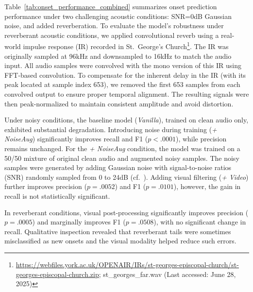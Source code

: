 \documentclass{article}
\begin{document}
Table~\ref{tab:onset_performance_combined} summarizes onset prediction performance under two challenging acoustic conditions: SNR=0\si{dB} Gaussian noise, and added reverberation. To evaluate the model's robustness under reverberant acoustic conditions, we applied convolutional reverb using a real-world impulse response (IR) recorded in St.~George's Church\footnote{\href{https://webfiles.york.ac.uk/OPENAIR/IRs/st-georges-episcopal-church/st-georges-episcopal-church.zip}{https://webfiles.york.ac.uk/OPENAIR/IRs/st-georges-episcopal-church/st-georges-episcopal-church.zip}; st\_georges\_far.wav (Last accessed: June 28, 2025)}. The IR was originally sampled at 96\si{kHz} and downsampled to 16\si{kHz} to match the audio input. All audio samples were convolved with the mono version of this IR using FFT-based convolution. To compensate for the inherent delay in the IR (with its peak located at sample index 653), we removed the first 653 samples from each convolved output to ensure proper temporal alignment. The resulting signals were then peak-normalized to maintain consistent amplitude and avoid distortion.


Under noisy conditions, the baseline model (\textit{Vanilla}), trained on clean audio only, exhibited substantial degradation. Introducing noise during training (\textit{+ NoiseAug}) significantly improves recall and F1 ($p < .0001$), while precision remains unchanged. For the \textit{+ NoiseAug} condition, the model was trained on a 50/50 mixture of original clean audio and augmented noisy samples. The noisy samples were generated by adding Gaussian noise with signal-to-noise ratios (SNR) randomly sampled from 0 to 24\si{dB} (cf.~\cite{ISMIR24Kim}). Adding visual filtering (\textit{+ Video}) further improves precision ($p = .0052$) and F1 ($p = .0101$), however, the gain in recall is not statistically significant.

In reverberant conditions, visual post-processing significantly improves precision ($p = .0005$) and marginally improves F1 ($p = .0508$), with no significant change in recall. Qualitative inspection revealed that reverberant tails were sometimes misclassified as new onsets and the visual modality helped reduce such errors.

 
\end{document}
